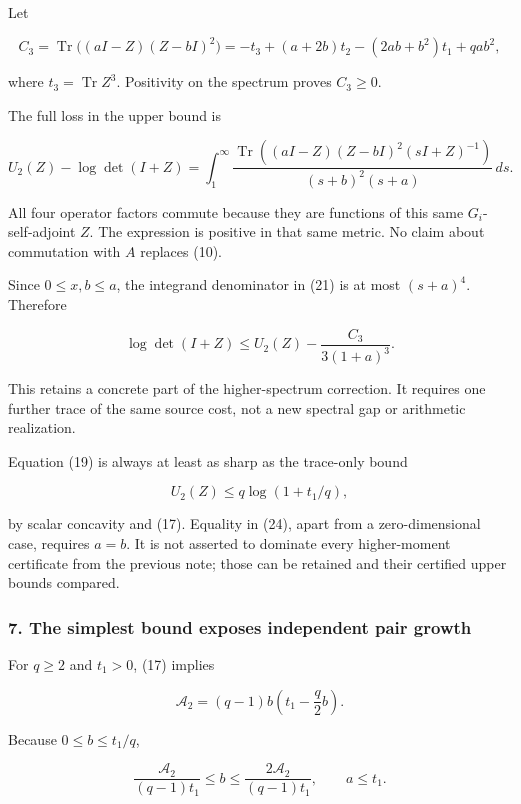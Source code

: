 Let

\[
 C_3=\operatorname{Tr}\bigl((aI-Z)(Z-bI)^2\bigr)
 =-t_3+(a+2b)t_2-(2ab+b^2)t_1+qa b^2,
\]

where \(t_3=\operatorname{Tr}Z^3\). Positivity on the spectrum proves \(C_3\ge0\).

The full loss in the upper bound is

\[
 \boxed{
 U_2(Z)-\log\det(I+Z)
 =\int_1^\infty
 \frac{\operatorname{Tr}((aI-Z)(Z-bI)^2(sI+Z)^{-1})}
 {(s+b)^2(s+a)}\,ds.
 }                                                             \tag{22}
\]

All four operator factors commute because they are functions of this same \(G_i\)-self-adjoint \(Z\). The expression is positive in that same metric. No claim about commutation with \(A\) replaces (10).

Since \(0\le x,b\le a\), the integrand denominator in (21) is at most \((s+a)^4\). Therefore

\[
 \boxed{\log\det(I+Z)
 \le U_2(Z)-\frac{C_3}{3(1+a)^3}.}                              \tag{23}
\]

This retains a concrete part of the higher-spectrum correction. It requires one further trace of the same source cost, not a new spectral gap or arithmetic realization.

Equation (19) is always at least as sharp as the trace-only bound

\[
 U_2(Z)\le q\log(1+t_1/q),                                     \tag{24}
\]

by scalar concavity and (17). Equality in (24), apart from a zero-dimensional case, requires \(a=b\). It is not asserted to dominate every higher-moment certificate from the previous note; those can be retained and their certified upper bounds compared.

\subsubsection{7. The simplest bound exposes independent pair growth}\label{endpoint-relation_moment_original--the-simplest-bound-exposes-independent-pair-growth}

For \(q\ge2\) and \(t_1>0\), (17) implies

\[
 \mathcal A_2=(q-1)b\left(t_1-\frac q2b\right).
\]

Because \(0\le b\le t_1/q\),

\[
 \frac{\mathcal A_2}{(q-1)t_1}\le b
 \le\frac{2\mathcal A_2}{(q-1)t_1},\qquad a\le t_1.
\]

